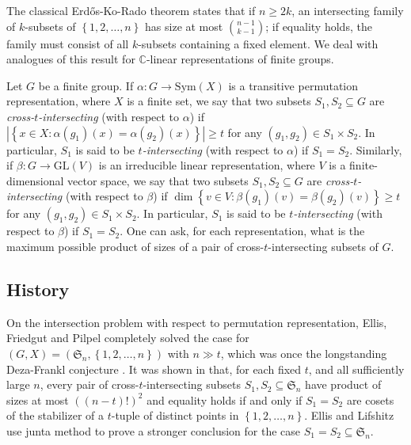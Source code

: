 \documentclass[12pt, reqno]{amsart}
\theoremstyle{definition}
\theoremstyle{remark}
\numberwithin{equation}{section}
\newcommand{\BC}{\mathbb{C}}
\newcommand{\gs}{\geqslant}
\newcommand{\pt}[1]{\left(#1\right)}
\newcommand{\cb}[1]{\left\{#1\right\}}
\newcommand{\abs}[1]{\left|#1\right|}
\newcommand{\fS}{\mathfrak{S}}
\newcommand{\GL}{\mathrm{GL}}
\newcommand{\Sym}{\mathrm{Sym}}
\begin{document}
The classical Erd\H{o}s-Ko-Rado theorem \cite{MR140419} states that if $n \gs 2k$, an intersecting family of $k$-subsets of $\cb{1, 2, \ldots, n}$ has size at most $\binom{n - 1}{k - 1}$; if equality holds, the family must consist of all $k$-subsets containing a fixed element. We deal with analogues of this result for $\BC$-linear representations of finite groups.

Let $G$ be a finite group. If $\alpha: G \rightarrow \Sym(X)$ is a transitive permutation representation, where $X$ is a finite set, we say that two subsets $S_1, S_2 \subseteq G$ are \emph{cross-$t$-intersecting} (with respect to $\alpha$) if $\abs{\cb{x \in X: \alpha(g_1)(x) = \alpha(g_2)(x)}} \gs t$ for any $(g_1, g_2) \in S_1 \times S_2$. In particular, $S_1$ is said to be \emph{$t$-intersecting} (with respect to $\alpha$) if $S_1 = S_2$. Similarly, if $\beta: G \rightarrow \GL(V)$ is an irreducible linear representation, where $V$ is a finite-dimensional vector space, we say that two subsets $S_1, S_2 \subseteq G$ are \emph{cross-$t$-intersecting} (with respect to $\beta$) if $\dim\cb{v \in V: \beta(g_1)(v) = \beta(g_2)(v)} \gs t$ for any $(g_1, g_2) \in S_1 \times S_2$. In particular, $S_1$ is said to be \emph{$t$-intersecting} (with respect to $\beta$) if $S_1 = S_2$. One can ask, for each representation, what is the maximum possible product of sizes of a pair of cross-$t$-intersecting subsets of $G$.

\subsection{History}

On the intersection problem with respect to permutation representation, Ellis, Friedgut and Pilpel \cite{MR2784326} completely solved the case for $(G, X) = (\fS_n, \cb{1, 2, \ldots, n})$ with $n \gg t$, which was once the longstanding Deza-Frankl conjecture \cite{MR439648}. It was shown in \cite{MR2784326} that, for each fixed $t$, and all sufficiently large $n$, every pair of cross-$t$-intersecting subsets $S_1, S_2 \subseteq \fS_n$ have product of sizes at most $\pt{(n - t)!}^2$ and equality holds if and only if $S_1 = S_2$ are cosets of the stabilizer of a $t$-tuple of distinct points in $\cb{1, 2, \ldots, n}$. Ellis and Lifshitz \cite{MR4484211} use junta method to prove a stronger conclusion for the case $S_1 = S_2 \subseteq \fS_n$. 
\end{document}
